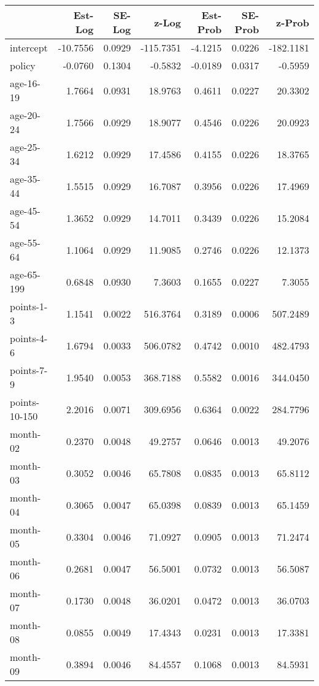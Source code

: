 \documentclass[10pt]{article}
\begin{document}
\begin{table}[ht]
\centering
\begin{tabular}{lrrrrrr}
  \hline
 & Est-Log & SE-Log & z-Log & Est-Prob & SE-Prob & z-Prob \\ 
  \hline
intercept & -10.7556 & 0.0929 & -115.7351 & -4.1215 & 0.0226 & -182.1181 \\ 
  policy & -0.0760 & 0.1304 & -0.5832 & -0.0189 & 0.0317 & -0.5959 \\ 
  age-16-19 & 1.7664 & 0.0931 & 18.9763 & 0.4611 & 0.0227 & 20.3302 \\ 
  age-20-24 & 1.7566 & 0.0929 & 18.9077 & 0.4546 & 0.0226 & 20.0923 \\ 
  age-25-34 & 1.6212 & 0.0929 & 17.4586 & 0.4155 & 0.0226 & 18.3765 \\ 
  age-35-44 & 1.5515 & 0.0929 & 16.7087 & 0.3956 & 0.0226 & 17.4969 \\ 
  age-45-54 & 1.3652 & 0.0929 & 14.7011 & 0.3439 & 0.0226 & 15.2084 \\ 
  age-55-64 & 1.1064 & 0.0929 & 11.9085 & 0.2746 & 0.0226 & 12.1373 \\ 
  age-65-199 & 0.6848 & 0.0930 & 7.3603 & 0.1655 & 0.0227 & 7.3055 \\ 
  points-1-3 & 1.1541 & 0.0022 & 516.3764 & 0.3189 & 0.0006 & 507.2489 \\ 
  points-4-6 & 1.6794 & 0.0033 & 506.0782 & 0.4742 & 0.0010 & 482.4793 \\ 
  points-7-9 & 1.9540 & 0.0053 & 368.7188 & 0.5582 & 0.0016 & 344.0450 \\ 
  points-10-150 & 2.2016 & 0.0071 & 309.6956 & 0.6364 & 0.0022 & 284.7796 \\ 
  month-02 & 0.2370 & 0.0048 & 49.2757 & 0.0646 & 0.0013 & 49.2076 \\ 
  month-03 & 0.3052 & 0.0046 & 65.7808 & 0.0835 & 0.0013 & 65.8112 \\ 
  month-04 & 0.3065 & 0.0047 & 65.0398 & 0.0839 & 0.0013 & 65.1459 \\ 
  month-05 & 0.3304 & 0.0046 & 71.0927 & 0.0905 & 0.0013 & 71.2474 \\ 
  month-06 & 0.2681 & 0.0047 & 56.5001 & 0.0732 & 0.0013 & 56.5087 \\ 
  month-07 & 0.1730 & 0.0048 & 36.0201 & 0.0472 & 0.0013 & 36.0703 \\ 
  month-08 & 0.0855 & 0.0049 & 17.4343 & 0.0231 & 0.0013 & 17.3381 \\ 
  month-09 & 0.3894 & 0.0046 & 84.4557 & 0.1068 & 0.0013 & 84.5931 \\ 

\end{tabular}
\end{table}
\end{document}
